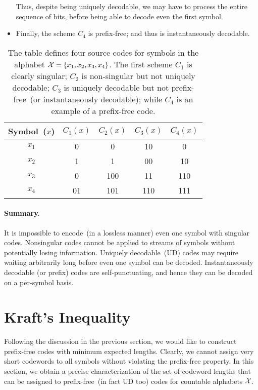 \begin{example}
\begin{itemize}
\begin{itemize}
            \end{itemize}
            Thus, despite being uniquely decodable, we may have to process the entire sequence of bits, before being able to decode even the first symbol. 
            \item Finally, the scheme $C_4$ is prefix-free; and thus is instantaneously decodable. 
        \end{itemize}
        \begin{table}[htb!]
            \centering
            \begin{tabular}{|c|c|c|c|c|} 
            \hline 
                 Symbol~($x$) & $C_1(x)$ & $C_2(x)$ & $C_3(x)$ & $C_4(x)$ \\ \hline 
                 $x_1$ & 0 & 0 & 10 & 0 \\
                 $x_2$ & 1 & 1 & 00 & 10 \\
                 $x_3$ & 0 & 100 & 11 & 110 \\
                 $x_4$ & 01 & 101 & 110 & 111 \\ 
                 \hline 
            \end{tabular}
            \caption{The table defines four source codes for symbols in the alphabet $\mathcal{X}=\{x_1, x_2, x_3, x_4\}$. The first scheme $C_1$ is clearly singular; $C_2$ is non-singular but not uniquely decodable; $C_3$ is uniquely decodable but not prefix-free~(or instantaneously decodable); while $C_4$ is an example of a prefix-free code.}
            \label{tab:source-code-examples}
        \end{table}
    \end{example}   
    \paragraph{Summary.} It is impossible to encode~(in a lossless manner) even one symbol with singular codes. Nonsingular codes cannot be applied to streams of symbols without potentially losing information. Uniquely decodable~(UD) codes may require waiting arbitrarily long before even one symbol can be decoded. Instantaneously decodable (or prefix) codes are self-punctuating, and hence they can be decoded on a per-symbol basis. 


\section{Kraft's Inequality} 
\label{sec:kraft}
    Following the discussion in the previous section, we would like to construct prefix-free codes with minimum expected lengths. Clearly, we cannot assign very short codewords to all symbols without violating the prefix-free property. In this section, we obtain a precise characterization of the set of codeword lengths that can be assigned to prefix-free~(in fact UD too) codes for countable alphabets $\mathcal{X}$. 

